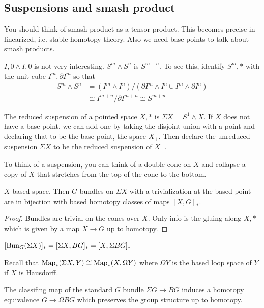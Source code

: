 \documentclass[12pt]{article}
\begin{document}
\subsection{Suspensions and smash product}
You should think of smash product as a tensor product. This becomes precise in linearized, i.e. stable homotopy theory. Also we need base points to talk about smash products. 
\begin{example}
    $I,0 \wedge I,0$ is not very interesting. $S^m \wedge S^n$ is $S^{m+n}$. To see this, identify $S^m,*$ with the unit cube $I^m,\partial I^m$ so that \begin{align*}
    S^m \wedge S^n &= (I^m \wedge I^n) / (\partial I^m \wedge I^n \cup I^m \wedge \partial I^n) \\
    &\cong I^{m+n} / \partial I^{m+n} \cong S^{m+n}
    \end{align*}
\end{example}

\begin{definition}
    The reduced suspension of a pointed space $X,*$ is $\Sigma X = S^1 \wedge X$. If $X$ does not have a base point, we can add one by taking the disjoint union with a point and declaring that to be the base point, the space $X_+$. Then declare the unreduced suspension $\Sigma X$ to be the reduced suspension of $X_+$.
\end{definition}
To think of a suspension, you can think of a double cone on $X$ and collapse a copy of $X$ that stretches from the top of the cone to the bottom.

\begin{theorem}
    $X$ based space. Then $G$-bundles on $\Sigma X$ with a trivialization at the based point are in bijection with based homotopy classes of maps $[X, G]_*$. 
\end{theorem}

\begin{proof}
    Bundles are trivial on the cones over $X$. Only info is the gluing along $X,*$ which is given by a map $X \to G$ up to homotopy.
\end{proof}

\begin{corollary}
    $[\operatorname{Bun}_G(\Sigma X)]_* = [\Sigma X, BG]_* = [X, \Sigma BG]_*$
\end{corollary}

Recall that $\operatorname{Map}_*(\Sigma X, Y)\cong \operatorname{Map}_*(X, \Omega Y)$ where $\Omega Y$ is the based loop space of $Y$ if $X$ is Hausdorff.

\begin{corollary}
    The classifing map of the standard $G$ bundle $\Sigma G \to BG$ induces a homotopy equivalence $G \to \Omega BG$ which preserves the group structure up to homotopy. 
\end{corollary}
\end{document}
